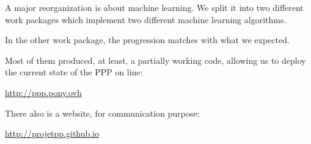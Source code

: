 A major reorganization is about machine learning. We split it into two different work packages which implement two different machine learning algorithms.

In the other work package, the progression matches with what we expected.

Most of them produced, at least, a partially working code, allowing us to deploy the current state of the PPP on line:

\begin{center}
    \url{http://ppp.pony.ovh}
\end{center}

There also is a website, for communication purpose:

\begin{center}
    \url{http://projetpp.github.io}
\end{center}
